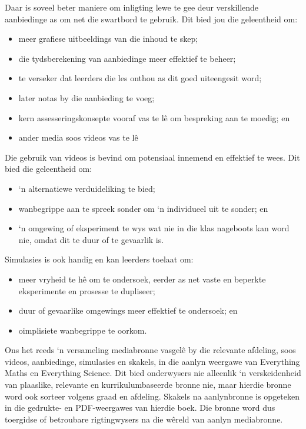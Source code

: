 Daar is soveel beter maniere om inligting lewe te gee deur verskillende aanbiedinge as om net die swartbord te gebruik. Dit bied jou die geleentheid om:
\begin{itemize}[noitemsep]
\item meer grafiese uitbeeldings van die inhoud te skep;
\item die tydsberekening van aanbiedinge meer effektief te beheer;
\item te verseker dat leerders die les onthou as dit goed uiteengesit word;
\item later notas by die aanbieding te voeg;
\item kern assesseringskonsepte vooraf vas te lê om bespreking aan te moedig; en 
\item ander media soos videos vas te lê
\end{itemize}

Die gebruik van videos is bevind om potensiaal innemend en effektief te wees. Dit bied die geleentheid om:
\begin{itemize}[noitemsep]
\item ‘n alternatiewe verduideliking te bied;
\item wanbegrippe aan te spreek sonder om ‘n individueel uit te sonder; en
\item ‘n omgewing of eksperiment te wys wat nie in die klas nageboots kan word nie, omdat dit te duur of te gevaarlik is.
\end{itemize}


Simulasies is ook handig en kan leerders toelaat om:
\begin{itemize}[noitemsep]
\item meer vryheid te hê om te ondersoek, eerder as net vaste en beperkte eksperimente en prosesse te dupliseer;
\item duur of gevaarlike omgewings meer effektief te ondersoek; en 
\item oimplisiete wanbegrippe te oorkom.
\end{itemize}
Ons het reeds ‘n versameling mediabronne vasgelê by die relevante afdeling, soos videos, aanbiedinge, simulasies en skakels, in die aanlyn weergawe van Everything Maths en Everything Science. Dit bied onderwysers nie alleenlik ‘n verskeidenheid van plaaslike, relevante en kurrikulumbaseerde bronne nie, maar hierdie bronne word ook sorteer volgens graad en afdeling. Skakels na aanlynbronne is opgeteken in die gedrukte- en PDF-weergawes van hierdie boek. Die bronne word dus toergidse of betroubare rigtingwysers na die wêreld van aanlyn mediabronne.\par


